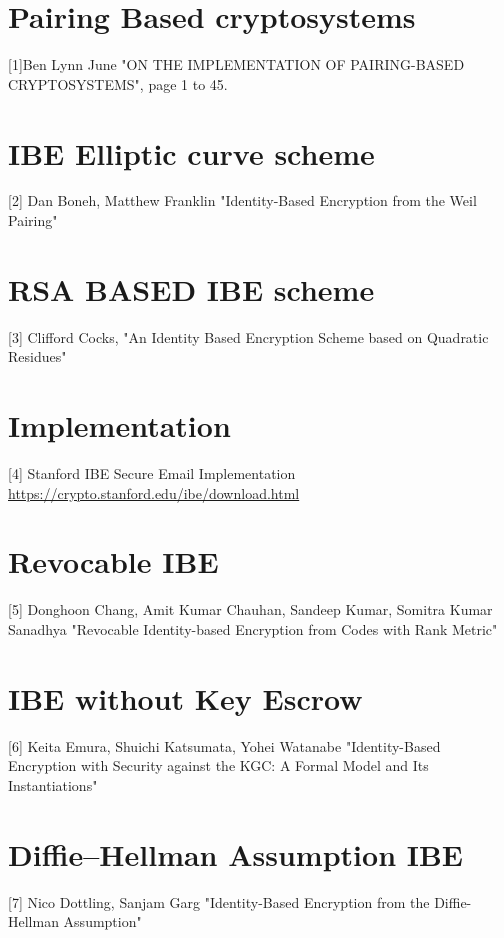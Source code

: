\documentclass[conference]{IEEEtran}
\begin{document}
\appendix
\section{Pairing Based cryptosystems}
[1]Ben Lynn June "ON THE IMPLEMENTATION OF PAIRING-BASED CRYPTOSYSTEMS", 
page 1 to 45.

\section{IBE Elliptic curve scheme}
[2] Dan Boneh, Matthew Franklin "Identity-Based Encryption from the Weil Pairing"

\section{RSA BASED IBE scheme}
[3] Clifford Cocks, "An Identity Based Encryption Scheme based on Quadratic Residues"

\section{Implementation}
[4] Stanford IBE Secure Email Implementation \url{https://crypto.stanford.edu/ibe/download.html}

\section{Revocable IBE}
[5] Donghoon Chang, Amit Kumar Chauhan, Sandeep Kumar, Somitra Kumar Sanadhya "Revocable Identity-based Encryption from Codes with Rank Metric"

\section{IBE without Key Escrow}
[6] Keita Emura, Shuichi Katsumata, Yohei Watanabe "Identity-Based Encryption with Security against the KGC: A Formal Model and Its Instantiations"

\section{Diffie–Hellman Assumption IBE}
[7] Nico Dottling, Sanjam Garg "Identity-Based Encryption from the Diffie-Hellman Assumption"
\end{document}
